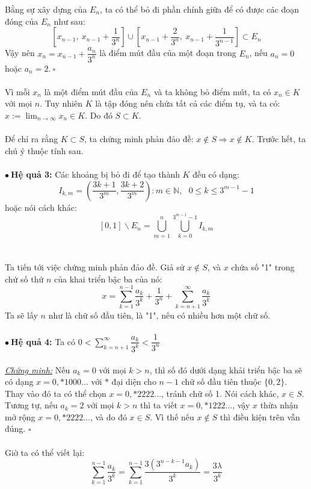 \documentclass[10.5pt, a4paper]{article}
\begin{document}
Bằng sự xây dựng của $E_n$, ta có thể bỏ đi phần chính giữa để có được các đoạn đóng của $E_n$ như sau: $$\left[x_{n-1},~x_{n-1}+\dfrac{1}{3^n}\right]\cup\left[x_{n-1}+\dfrac{2}{3^n},~x_{n-1}+\dfrac{1}{3^{n-1}}\right]\subset E_n$$
Vậy nên $x_n=x_{n-1}+\dfrac{a_n}{3^n}$ là điểm mút đầu của một đoạn trong $E_n$, nếu $a_n=0$ hoặc $a_n=2.~\square$\\\\
Vì mỗi $x_n$ là một điểm mút đầu của $E_n$ và ta không bỏ điểm mút, ta có $x_n\in K$ với mọi $n$. Tuy nhiên $K$ là tập đóng nên chứa tất cả các điểm tụ, và ta có: $x:=\displaystyle\lim_{n\rightarrow\infty}x_n\in K$. Do đó $S\subset K$.\\\\
Để chỉ ra rằng $K\subset S$, ta chứng minh phản đảo đề: $x\notin S\Longrightarrow x\notin K$. Trước hết, ta chú ý thuộc tính sau.\\\\
$\bullet~$\textbf{Hệ quả 3:} Các khoảng bị bỏ đi để tạo thành $K$ đều có dạng: $$I_{k,m}=\left(\dfrac{3k+1}{3^m},\dfrac{3k+2}{3^m}\right):m\in\mathbb N,~~~0\le k\le3^{m-1}-1$$
hoặc nói cách khác: $$[0,1]\backslash E_n=\displaystyle\bigcup_{m=1}^n\displaystyle\bigcup_{k=0}^{3^{m-1}-1}I_{k,m}$$\\\\
Ta tiến tới việc chứng minh phản đảo đề. Giả sử $x\notin S$, và $x$ chứa số "1" trong chứ số thứ $n$ của khai triển bậc ba của nó: $$x=\displaystyle\sum_{k=1}^{n-1}\dfrac{a_k}{3^k}+\dfrac{1}{3^n}+\displaystyle\sum_{k=n+1}^\infty\dfrac{a_k}{3^k}$$
Ta sẽ lấy $n$ như là chữ số đầu tiên, là "1", nếu có nhiều hơn một chữ số.\\\\
$\bullet~$\textbf{Hệ quả 4:} Ta có $0<\displaystyle\sum_{k=n+1}^\infty\dfrac{a_k}{3^k}<\dfrac{1}{3^n}$\\\\
\underline{\textit{Chứng minh:}} Nếu $a_k=0$ với mọi $k>n$, thì số đó dưới dạng khải triển bậc ba sẽ có dạng $x=0,*1000\ldots$ với $*$ đại diện cho $n-1$ chữ số đầu tiên thuộc $\{0,2\}$. Thay vào đó ta có thể chọn $x=0,*2222\ldots$, tránh chữ số 1. Nói cách khác, $x\in S$. Tương tự, nếu $a_k=2$ với mọi $k>n$ thì ta viết $x=0,*1222\ldots$, vậy $x$ thừa nhận mở rộng $x=0,*2222\ldots$, và do đó $x\in S$. Vì thế nếu $x\notin S$ thì điều kiện trên vẫn đúng. $\square$\\\\
Giờ ta có thể viết lại: $$\displaystyle\sum_{k=1}^{n-1}\dfrac{a_k}{3^k}=\displaystyle\sum_{k=1}^{n-1}\dfrac{3(3^{n-k-1}a_k)}{3^k}=\dfrac{3\lambda}{3^k}$$
\end{document}
